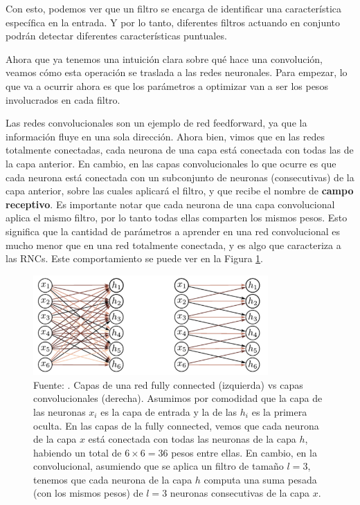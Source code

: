\documentclass[../../main.tex]{subfiles}
\begin{document}
Con esto, podemos ver que un filtro se encarga de identificar una característica
específica en la entrada. Y por lo tanto, diferentes filtros actuando en conjunto podrán
detectar diferentes características puntuales.

Ahora que ya tenemos una intuición clara sobre qué hace una convolución, veamos
cómo esta operación se traslada a las redes neuronales. Para empezar, lo que va a
ocurrir ahora es que los parámetros a optimizar van a ser los pesos involucrados
en cada filtro.

Las redes convolucionales son un ejemplo de red feedforward, ya que la información fluye
en una sola dirección. Ahora bien, vimos que en las redes totalmente conectadas, cada
neurona de una capa está conectada con todas las de la capa anterior. En cambio, en las
capas convolucionales lo que ocurre es que cada neurona está conectada con un subconjunto de
neuronas (consecutivas) de la capa anterior, sobre las cuales aplicará el filtro, y que
recibe el nombre de \textbf{campo receptivo}. Es importante notar que cada neurona de una
capa convolucional aplica el mismo filtro, por lo tanto todas ellas comparten los mismos
pesos. Esto significa que la cantidad de parámetros a aprender en una red convolucional es
mucho menor que en una red totalmente conectada, y es algo que caracteriza a las RNCs.
Este comportamiento se puede ver en la Figura \ref{fig:fully-connected-vs-conv}.

\begin{figure}
    \centering
    \includegraphics[width=0.8\textwidth]{figs/fully-connected-vs-conv.png}
    \caption{Fuente: \cite{prince2024understanding}. Capas de una red fully connected
    (izquierda) vs capas convolucionales (derecha). Asumimos por comodidad que la capa de
    las neuronas \(x_i\) es la capa de entrada y la de las \(h_i\) es la primera oculta.
    En las capas de la fully connected, vemos que cada neurona de la capa \(x\) está
    conectada con todas las neuronas de la capa \(h\), habiendo un total de \(6 \times 6 =
    36\) pesos entre ellas. En cambio, en la convolucional, asumiendo que se aplica
    un filtro de tamaño \(l=3\), tenemos que cada neurona de la capa \(h\) computa una
    suma pesada (con los mismos pesos) de \(l=3\) neuronas consecutivas de la capa \(x\).}
    \label{fig:fully-connected-vs-conv}
\end{figure}
\end{document}
